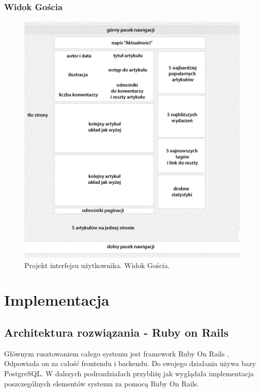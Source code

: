 \documentclass[openright]{xmgr}
\begin{document}
\newpage

\subsection{Widok Gościa}
\begin{figure}[!tbh]
\centering
\includegraphics[width=.9\linewidth]{fig/gui_guest}
\caption{Projekt interfejsu użytkownika. Widok Gościa.\label{RYS.5}}
\end{figure}

\chapter{Implementacja}

\section{Architektura rozwiązania - Ruby on Rails}
Głównym rusztowaniem całego systemu jest framework Ruby On Rails \cite{ror} \cite{enterprise} \cite{wikibook}. Odpowiada on za całość frontendu i backendu. Do swojego działania używa bazy PostgreSQL. W dalszych podrozdziałach przybliżę jak wyglądała implementacja poszczególnych elementów systemu za pomocą Ruby On Rails.
\end{document}
